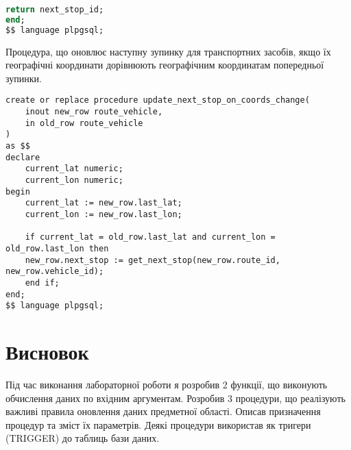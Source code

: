 \documentclass[14pt]{extreport}
\begin{document}
\begin{normalsize}
\begin{small}
\begin{lstlisting}[language=sql]
	return next_stop_id;
end;
$$ language plpgsql;
		\end{lstlisting}
	\end{small}
	
	Процедура, що оновлює наступну зупинку для транспортних засобів, якщо їх географічні координати дорівнюють географічним координатам попередньої зупинки.
	\begin{small}
		\begin{lstlisting}
create or replace procedure update_next_stop_on_coords_change(
	inout new_row route_vehicle,
	in old_row route_vehicle
)
as $$
declare
	current_lat numeric;
	current_lon numeric;
begin
	current_lat := new_row.last_lat;
	current_lon := new_row.last_lon;

	if current_lat = old_row.last_lat and current_lon = old_row.last_lon then
	new_row.next_stop := get_next_stop(new_row.route_id, new_row.vehicle_id);
	end if;
end;
$$ language plpgsql;
		\end{lstlisting}
	\end{small}
	
	\section*{Висновок}
	Під час виконання лабораторної роботи я розробив 2 функції, що виконують обчислення даних по вхідним аргументам. Розробив 3 процедури, що реалізують важливі правила оновлення даних предметної області. Описав призначення процедур та зміст їх параметрів. Деякі процедури використав як тригери (TRIGGER) до таблиць бази даних.
	 
\end{normalsize}
\end{document}
